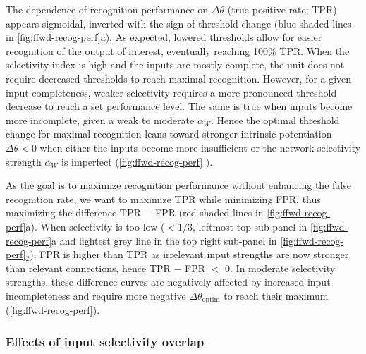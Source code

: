 The dependence of recognition performance on $\Delta\theta$ (true positive rate; TPR)
    appears sigmoidal, inverted with the sign of threshold change
        (blue shaded lines in \autoref{fig:ffwd-recog-perf}a).
    As expected, lowered thresholds allow for easier recognition of the output of interest, eventually reaching 100\% TPR.
    When the selectivity index is high and the inputs are mostly complete, the unit does not require decreased thresholds to reach maximal recognition.
    However, for a given input completeness, weaker selectivity requires a more pronounced threshold decrease to reach a set performance level.
    The same is true when inputs become more incomplete, given a weak to moderate $\alpha_W$.
    Hence the optimal threshold change for maximal recognition leans toward stronger intrinsic potentiation $\Delta \theta < 0$
        when either the inputs become more insufficient or the network selectivity strength $\alpha_W$ is imperfect (\autoref{fig:ffwd-recog-perf}
        ).


As the goal is to maximize recognition performance without enhancing the false recognition rate,
        we want to maximize TPR while minimizing FPR,
        thus maximizing the difference TPR $-$ FPR
        (red shaded lines in \autoref{fig:ffwd-recog-perf}a).
    When selectivity is too low
        ($ < 1/3$, leftmost top sub-panel in \autoref{fig:ffwd-recog-perf}a
        and lightest grey line in the top right sub-panel in
        \autoref{fig:ffwd-recog-perf}$_2$),
        FPR is higher than TPR as irrelevant input strengths are now stronger than relevant connections,
        hence TPR $-$ FPR $<$ 0.
    In moderate selectivity strengths, these difference curves
        are negatively affected by increased input incompleteness
        and require more negative $\Delta \theta_{\mathrm{optim}}$ to reach their maximum
        (\autoref{fig:ffwd-recog-perf}).

\subsubsection*{Effects of input selectivity overlap}

